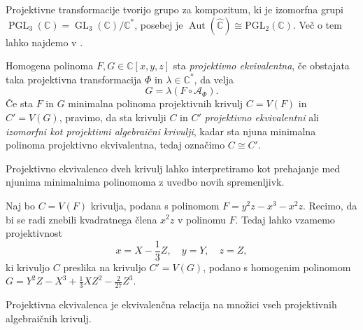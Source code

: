 \documentclass[mat1]{fmfdelo}
\numberwithin{equation}{section}
\newcommand{\C}{\mathbb C}
\newcommand{\CM}{\mathbb C ^*}
\newcommand{\RS}{\widehat{\C}}
\newcommand{\Cxyz}{\C[x,y,z]}
\newcommand{\kom}[1]{
    \underline{//#1}
}
\DeclareMathOperator{\GL}{GL}
\DeclareMathOperator{\Aut}{Aut}
\theoremstyle{definition}
\begin{document}
Projektivne transformacije tvorijo grupo za kompozitum, ki je izomorfna grupi $\operatorname{PGL}_3(\C) = \GL_3(\C)/\CM$, posebej je $\Aut(\RS) \cong \operatorname{PGL_2(\C)}$. Več o tem lahko najdemo v \cite[poglavje 11]{Gibson}.

\begin{definicija}
    Homogena polinoma $F,G \in \Cxyz$ sta \emph{projektivno ekvivalentna}, če obstajata taka projektivna transformacija $\Phi$ in $\lambda \in \CM$, da velja
    $$ G = \lambda (F \circ \mathcal{A}_\Phi). $$
    Če sta $F$ in $G$ minimalna polinoma projektivnih krivulj $C = V(F)$ in $C' = V(G)$, pravimo, da sta krivulji $C$ in $C'$ \emph{projektivno ekvivalentni} ali \emph{izomorfni kot projektivni algebraični krivulji}, kadar sta njuna minimalna polinoma projektivno ekvivalentna, tedaj označimo $C \cong C'$. 
\end{definicija}

Projektivno ekvivalenco dveh krivulj lahko interpretiramo kot prehajanje med njunima minimalnima polinomoma z uvedbo novih spremenljivk.

\begin{zgled*}
    \label{zgled projektivne ekviv.}
    Naj bo $C = V(F)$ krivulja, podana s polinomom $F = y^2z - x^3 - x^2z$. Recimo, da bi se radi znebili kvadratnega člena $x^2z$ v polinomu $F$. Tedaj lahko vzamemo projektivnost 
    \[
        x = X - \frac{1}{3}Z, \quad y = Y, \quad z = Z,
    \]
    ki krivuljo $C$ preslika na krivuljo $C' = V(G)$, podano s homogenim polinomom $G = Y^2Z - X^3 + \frac13 XZ^2 - \frac{2}{27}Z^3$. 
\end{zgled*}

\begin{trditev}
    Projektivna ekvivalenca je ekvivalenčna relacija na množici vseh projektivnih algebraičnih krivulj.
\end{trditev}
\end{document}
